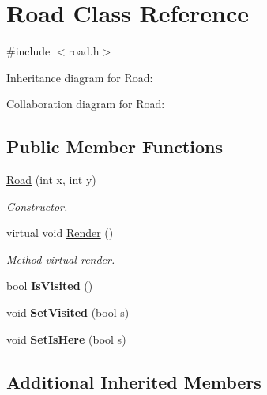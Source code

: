 \hypertarget{classRoad}{}\section{Road Class Reference}
\label{classRoad}


{\ttfamily \#include $<$road.\+h$>$}



Inheritance diagram for Road\+:


Collaboration diagram for Road\+:
\subsection*{Public Member Functions}
\begin{DoxyCompactItemize}
\item 
\hyperlink{classRoad_adf96d914718db461bddfbc5e5a0312cc}{Road} (int x, int y)
\begin{DoxyCompactList}\small\item\em Constructor. \end{DoxyCompactList}\item 
virtual void \hyperlink{classRoad_a1a765835fb4bd7c64d12a511a72552b9}{Render} ()\hypertarget{classRoad_a1a765835fb4bd7c64d12a511a72552b9}{}\label{classRoad_a1a765835fb4bd7c64d12a511a72552b9}

\begin{DoxyCompactList}\small\item\em Method virtual render. \end{DoxyCompactList}\item 
bool {\bfseries Is\+Visited} ()\hypertarget{classRoad_a2015eb6ca5c6a3b9f3d2e4fd13eb8e05}{}\label{classRoad_a2015eb6ca5c6a3b9f3d2e4fd13eb8e05}

\item 
void {\bfseries Set\+Visited} (bool s)\hypertarget{classRoad_a12f23535261fa769f0f26b8b450c1e9f}{}\label{classRoad_a12f23535261fa769f0f26b8b450c1e9f}

\item 
void {\bfseries Set\+Is\+Here} (bool s)\hypertarget{classRoad_a86de16ad0c78e6638a5803572b71bdf5}{}\label{classRoad_a86de16ad0c78e6638a5803572b71bdf5}

\end{DoxyCompactItemize}
\subsection*{Additional Inherited Members}


